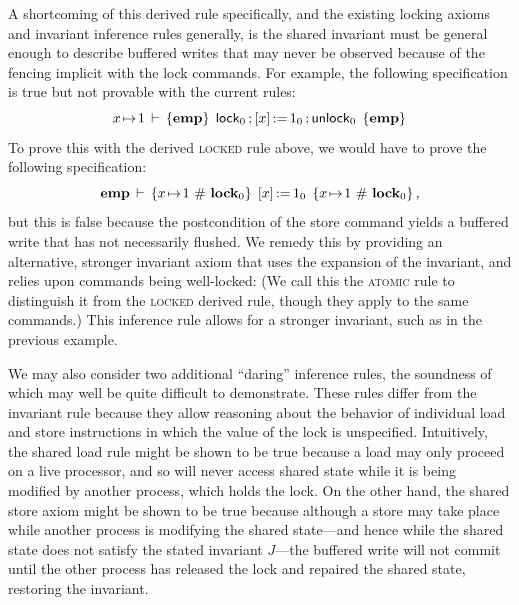 \documentclass[11pt]{report}
\begin{document}
A shortcoming of this derived rule specifically, and the existing locking axioms and invariant inference rules generally, is the shared invariant must be general enough to describe buffered writes that may never be observed because of the fencing implicit with the lock commands. For example, the following specification is true but not provable with the current rules:     \[ x \!\mapsto\! 1\,\vdash\,\left\lbrace \mathbf{emp} \right\rbrace\;\operatorname{\mathsf{lock}}_0 \operatorname{;} \left[ x \right] \operatorname{:\!=} 1_0 \operatorname{;} \operatorname{\mathsf{unlock}}_0\;\left\lbrace \mathbf{emp} \right\rbrace \] To prove this with the derived \textsc{locked} rule above, we would have to prove the following specification: \[ \mathbf{emp}\,\vdash\,\left\lbrace x \!\mapsto\! 1 \operatorname{\,\#\,} \mathbf{lock}_{0} \right\rbrace\;\left[ x \right] \operatorname{:\!=} 1_0\;\left\lbrace x \!\mapsto\! 1 \operatorname{\,\#\,} \mathbf{lock}_{0} \right\rbrace,\] but this is false because the postcondition of the store command yields a buffered write that has not necessarily flushed. We remedy this by providing an alternative, stronger invariant axiom that uses the expansion of the invariant, and relies upon commands being well-locked:  (We call this the \textsc{atomic} rule to distinguish it from the \textsc{locked} derived rule, though they apply to the same commands.) This inference rule allows for a stronger invariant, such as in the previous example. 
 
We may also consider two additional ``daring'' inference rules, the soundness of which may well be quite difficult to demonstrate. 
These rules differ from the invariant rule because they allow reasoning about the behavior of individual load and store instructions in which the value of the lock is unspecified. Intuitively, the shared load rule might be shown to be true because a load may only proceed on a live processor, and so will never access shared state while it is being modified by another process, which holds the lock. On the other hand, the shared store axiom might be shown to be true because although a store may take place while another process is modifying the shared state---and hence while the shared state does not satisfy the stated invariant $J$---the buffered write will not commit until the other process has released the lock and repaired the shared state, restoring the invariant.
\end{document}
